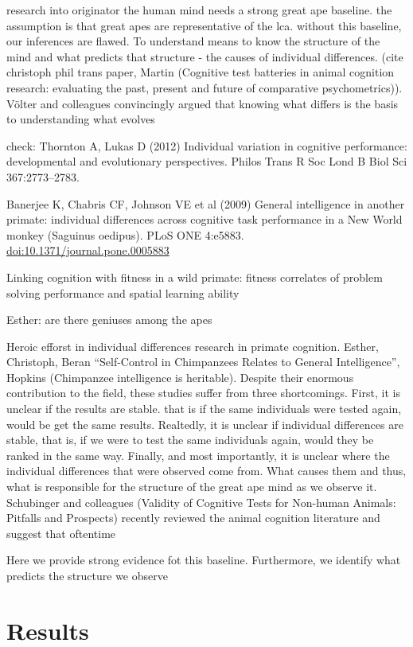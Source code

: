 \documentclass[
  man,floatsintext]{apa6}
\begin{document}
research into originator the human mind needs a strong great ape baseline. the assumption is that great apes are representative of the lca. without this baseline, our inferences are flawed. To understand means to know the structure of the mind and what predicts that structure - the causes of individual differences. (cite christoph phil trans paper, Martin (Cognitive test batteries in animal cognition research: evaluating the past, present and future of comparative psychometrics)). Völter and colleagues convincingly argued that knowing what differs is the basis to understanding what evolves

check:
Thornton A, Lukas D (2012) Individual variation in cognitive performance: developmental and evolutionary perspectives. Philos Trans R Soc Lond B Biol Sci 367:2773--2783.

Banerjee K, Chabris CF, Johnson VE et al (2009) General intelligence in another primate: individual differences across cognitive task performance in a New World monkey (Saguinus oedipus). PLoS ONE 4:e5883. \url{doi:10.1371/journal.pone.0005883}

Linking cognition with fitness in a wild
primate: fitness correlates of problem solving performance and spatial learning
ability

Esther: are there geniuses among the apes

Heroic efforst in individual differences research in primate cognition. Esther, Christoph, Beran ``Self-Control in Chimpanzees Relates to General Intelligence'', Hopkins (Chimpanzee intelligence is heritable). Despite their enormous contribution to the field, these studies suffer from three shortcomings. First, it is unclear if the results are stable. that is if the same individuals were tested again, would be get the same results. Realtedly, it is unclear if individual differences are stable, that is, if we were to test the same individuals again, would they be ranked in the same way. Finally, and most importantly, it is unclear where the individual differences that were observed come from. What causes them and thus, what is responsible for the structure of the great ape mind as we observe it. Schubinger and colleagues (Validity of Cognitive Tests for Non-human Animals: Pitfalls and Prospects) recently reviewed the animal cognition literature and suggest that oftentime

Here we provide strong evidence fot this baseline. Furthermore, we identify what predicts the structure we observe

\hypertarget{results}{%
\section{Results}\label{results}}
\end{document}
